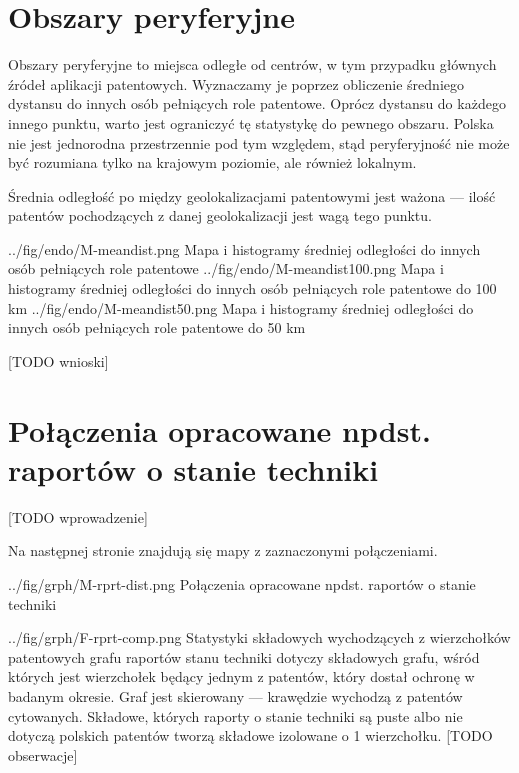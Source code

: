     \newpage\section
  {Obszary peryferyjne}

Obszary peryferyjne to miejsca odległe od centrów, w tym przypadku
głównych źródeł aplikacji patentowych. Wyznaczamy je poprzez obliczenie
średniego dystansu do innych osób pełniących role patentowe.
Oprócz dystansu do każdego innego punktu, warto jest ograniczyć
tę statystykę do pewnego obszaru. Polska nie jest jednorodna przestrzennie 
pod tym względem, stąd peryferyjność nie może być rozumiana tylko 
na krajowym poziomie, ale również lokalnym.

\begin{uwaga}
Średnia odległość po między geolokalizacjami patentowymi jest ważona ---
ilość patentów pochodzących z danej geolokalizacji jest wagą tego punktu.
\end{uwaga}

  \newpage\charttripled
{../fig/endo/M-meandist.png}
{ Mapa i histogramy średniej odległości do innych osób pełniących role patentowe }
{../fig/endo/M-meandist100.png}
{ Mapa i histogramy średniej odległości do innych osób pełniących role patentowe do 100 km }
{../fig/endo/M-meandist50.png}
{ Mapa i histogramy średniej odległości do innych osób pełniących role patentowe do 50 km }


[TODO wnioski]




    \newpage\section
  {Połączenia opracowane npdst. raportów o stanie techniki}

[TODO wprowadzenie]

Na następnej stronie znajdują się mapy z zaznaczonymi połączeniami.

\newpage

  \chart
{../fig/grph/M-rprt-dist.png}
{ Połączenia opracowane npdst. raportów o stanie techniki }\newpage

  \chartside
{../fig/grph/F-rprt-comp.png}
{ Statystyki składowych wychodzących z wierzchołków patentowych
  grafu raportów stanu techniki }{
 dotyczy składowych grafu, wśród których
jest wierzchołek będący jednym z patentów, który dostał ochronę w badanym okresie.
Graf jest skierowany --- krawędzie wychodzą z patentów cytowanych.
Składowe, których raporty o stanie techniki są puste albo nie dotyczą 
polskich patentów tworzą składowe izolowane o 1 wierzchołku.
[TODO obserwacje]
}




